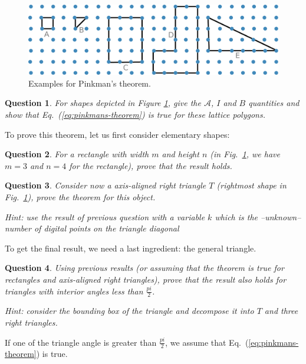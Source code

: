 \documentclass[a4paper, 11pt]{article}
\newtheorem{qu}{Question}
\begin{document}
\begin{figure}
  \begin{center}
    \includegraphics[width=14cm]{pick}
  \end{center}
  \caption{Examples for Pinkman's theorem.}
  \label{fig:pick}
\end{figure}
\begin{qu}
  For shapes depicted in Figure \ref{fig:pick}, give the
  $\mathcal{A}$, $I$ and $B$ quantities and show that
  Eq.~(\ref{eq:pinkmans-theorem}) is true for these lattice polygons.
\end{qu}



To prove this theorem, let us first consider elementary shapes:

\begin{qu}
\label{quQuad}
  For a rectangle with width $m$ and height $n$ (in
  Fig.~\ref{fig:pick}, we have $m=3$ and $n=4$ for the rectangle), prove
  that the result holds.
\end{qu}


\begin{qu}
  Consider now a \emph{axis-aligned} right triangle $T$ (rightmost shape in
  Fig.~\ref{fig:pick}), prove the theorem for this object.

  {Hint: use the result of previous question with a variable $k$ which
    is the --unknown-- number of digital points on the triangle
    diagonal}
\end{qu}


To get the final result, we need a last ingredient: the general
triangle.

\begin{qu}
  Using previous results (or assuming that the theorem is true for
  rectangles and axis-aligned right triangles), prove that the result also holds for
   triangles with interior angles less than $\frac{pi}{2}$.

  {Hint: consider the bounding box of the triangle and decompose
    it into $T$ and three right triangles.}
\end{qu}

If one of the triangle angle is greater than $\frac{pi}{2}$, we assume
that Eq.~(\ref{eq:pinkmans-theorem}) is true.
\end{document}

